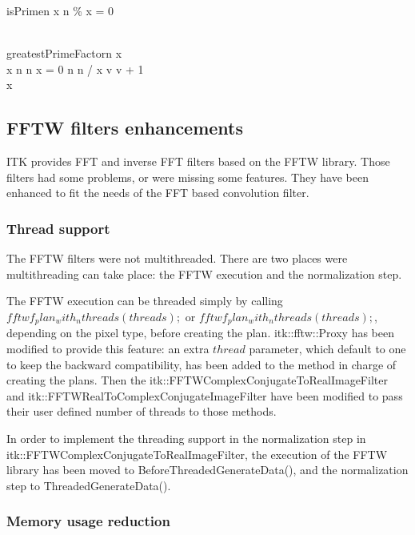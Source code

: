 \documentclass{InsightArticle}
\begin{document}
\begin{pseudocode}{isPrime}{n}
\FOREACH x \in [2, \sqrt{n}] \DO 
\BEGIN
  \IF n \% x = 0 \THEN \RETURN \FALSE \\
\END \\
\RETURN \TRUE
\end{pseudocode}

\begin{pseudocode}{greatestPrimeFactor}{n}
\label{greatestPrimeFactor}
x  \\
\WHILE x \leq n \DO
\BEGIN
  \IF n \bmod x = 0 \AND {}
  \THEN
    n \GETS n / x
  \ELSE
    v \GETS v + 1
\END \\
\RETURN x
\end{pseudocode}

\subsection{FFTW filters enhancements}

ITK provides FFT and inverse FFT filters based on the FFTW library. Those filters had some problems,
or were missing some features. They have been enhanced to fit the needs of the FFT based convolution
filter.

\subsubsection{Thread support}
The FFTW filters were not multithreaded. There are two places were multithreading can take place: the
FFTW execution and the normalization step.

The FFTW execution can be threaded simply by calling $fftwf_plan_with_nthreads(threads);$ or $fftwf_plan_with_nthreads(threads);$, depending on the pixel type, before creating the plan. 
itk::fftw::Proxy has been modified to provide this feature: an extra $thread$ parameter, which default
to one to keep the backward compatibility, has been added to the method in charge of creating the plans.
Then the itk::FFTWComplexConjugateToRealImageFilter and itk::FFTWRealToComplexConjugateImageFilter have
been modified to pass their user defined number of threads to those methods.

In order to implement the threading support in the normalization step in 
itk::FFTWComplexConjugateToRealImageFilter, the execution of the FFTW library has been moved to 
BeforeThreadedGenerateData(), and the normalization step to ThreadedGenerateData().

\subsubsection{Memory usage reduction}
\end{document}
